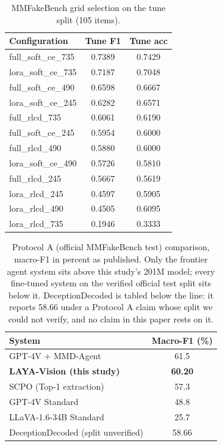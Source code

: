 \documentclass[conference]{IEEEtran}
\begin{document}
\begin{table}[t]
\centering
\caption{MMFakeBench grid selection on the tune split (105 items).}
\label{tab:grid}
\begin{tabular}{lcc}
\toprule
Configuration & Tune F1 & Tune acc \\
\midrule
full\_soft\_ce\_735 & 0.7389 & 0.7429 \\
lora\_soft\_ce\_735 & 0.7187 & 0.7048 \\
full\_soft\_ce\_490 & 0.6598 & 0.6667 \\
lora\_soft\_ce\_245 & 0.6282 & 0.6571 \\
full\_rlcd\_735 & 0.6061 & 0.6190 \\
full\_soft\_ce\_245 & 0.5954 & 0.6000 \\
full\_rlcd\_490 & 0.5880 & 0.6000 \\
lora\_soft\_ce\_490 & 0.5726 & 0.5810 \\
full\_rlcd\_245 & 0.5667 & 0.5619 \\
lora\_rlcd\_245 & 0.4597 & 0.5905 \\
lora\_rlcd\_490 & 0.4505 & 0.6095 \\
lora\_rlcd\_735 & 0.1946 & 0.3333 \\
\bottomrule
\end{tabular}
\end{table}

\begin{table}[t]
\centering
\caption{Protocol A (official MMFakeBench test) comparison, macro-F1 in percent as published. Only the frontier agent system sits above this study's 201M model; every fine-tuned system on the verified official test split sits below it. DeceptionDecoded is tabled below the line: it reports 58.66 under a Protocol A claim whose split we could not verify, and no claim in this paper rests on it.}
\label{tab:protocol}
\begin{tabular}{lc}
\toprule
System & Macro-F1 (\%) \\
\midrule
GPT-4V + MMD-Agent & 61.5 \\
\textbf{LAYA-Vision (this study)} & \textbf{60.20} \\
SCPO (Top-1 extraction) & 57.3 \\
GPT-4V Standard & 48.8 \\
LLaVA-1.6-34B Standard & 25.7 \\
\midrule
DeceptionDecoded (split unverified) & 58.66 \\
\bottomrule
\end{tabular}
\end{table}
\end{document}
